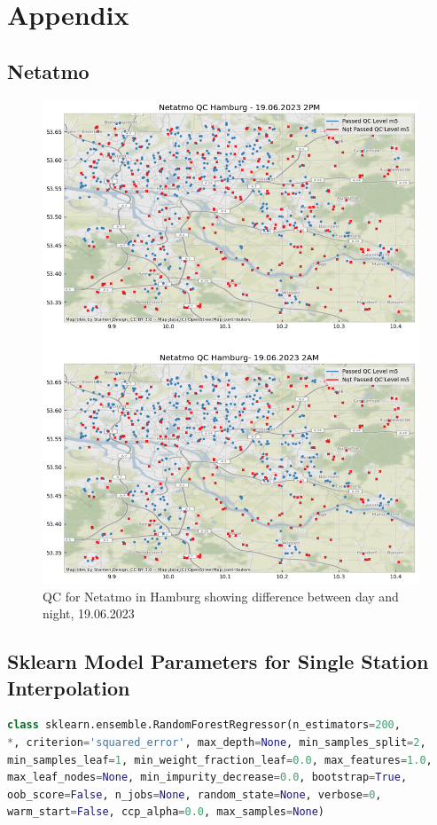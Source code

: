 \chapter{Appendix}

\section{Netatmo}
\label{appendix: netatmo}

\begin{figure}[ht]
    \centering
    \includegraphics[width=.8\textwidth]{images/qc_hamburg_netatmo_june_before_after.png}
    \caption{QC for Netatmo in Hamburg showing difference between day and night, 19.06.2023}
    \label{fig:qc netatmo hamburg before after m5}
\end{figure}

\section{Sklearn Model Parameters for Single Station Interpolation}
\label{appendix: sklearn ml parameters single station}

\begin{lstlisting}[language=Python, caption=Random Forest Regressor Parameters]
class sklearn.ensemble.RandomForestRegressor(n_estimators=200,
*, criterion='squared_error', max_depth=None, min_samples_split=2,
min_samples_leaf=1, min_weight_fraction_leaf=0.0, max_features=1.0,
max_leaf_nodes=None, min_impurity_decrease=0.0, bootstrap=True,
oob_score=False, n_jobs=None, random_state=None, verbose=0,
warm_start=False, ccp_alpha=0.0, max_samples=None)
\end{lstlisting}

